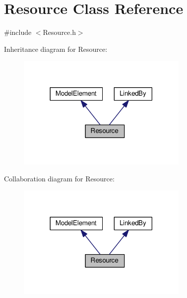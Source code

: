 \hypertarget{class_resource}{}\section{Resource Class Reference}
\label{class_resource}


{\ttfamily \#include $<$Resource.\+h$>$}



Inheritance diagram for Resource\+:\nopagebreak
\begin{figure}[H]
\begin{center}
\leavevmode
\includegraphics[width=234pt]{class_resource__inherit__graph}
\end{center}
\end{figure}


Collaboration diagram for Resource\+:\nopagebreak
\begin{figure}[H]
\begin{center}
\leavevmode
\includegraphics[width=234pt]{class_resource__coll__graph}
\end{center}
\end{figure}
